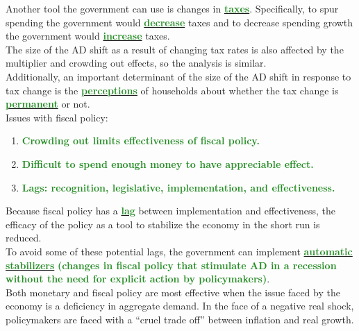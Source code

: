 \documentclass[11pt]{article}\usepackage[]{graphicx}\usepackage[]{color}
\theoremstyle{definition}
\newcommand{\ddp}[1]{{\textbf{\textcolor{ForestGreen}{#1}}}}
\newcommand{\dd}[1]{{\underline{\textbf{\textcolor{ForestGreen}{#1}}}}}
\begin{document}
Another tool the government can use is changes in \dd{taxes}. Specifically, to spur spending the government would \dd{decrease} taxes and to decrease spending growth the government would \dd{increase} taxes.
\\

The size of the AD shift as a result of changing tax rates is also affected by the multiplier and crowding out effects, so the analysis is similar.
\\

Additionally, an important determinant of the size of the AD shift in response to tax change is the \dd{perceptions} of households about whether the tax change is \dd{permanent} or not.
\\

Issues with fiscal policy:
\begin{enumerate}
	\item \ddp{Crowding out limits effectiveness of fiscal policy.}
	\item \ddp{Difficult to spend enough money to have appreciable effect.}
	\item \ddp{Lags: recognition, legislative, implementation, and effectiveness.}
\end{enumerate}
\vspace{1em}
Because fiscal policy has a \dd{lag} between implementation and effectiveness, the efficacy of the policy as a tool to stabilize the economy in the short run is reduced.
\\

To avoid some of these potential lags, the government can implement \dd{automatic stabilizers} \ddp{(changes in fiscal policy that stimulate AD in a recession without the need for explicit action by policymakers)}.
\\

Both monetary and fiscal policy are most effective when the issue faced by the economy is a deficiency in aggregate demand. In the face of a negative real shock, policymakers are faced with a ``cruel trade off'' between inflation and real growth.
\end{document}
